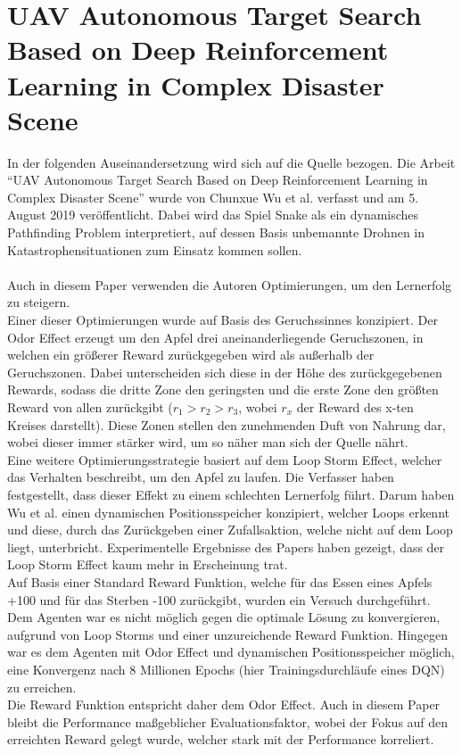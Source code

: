 \section{UAV Autonomous Target Search Based on Deep Reinforcement Learning in Complex Disaster Scene} \label{sec:Paper_2}
In der folgenden Auseinandersetzung wird sich auf die Quelle \cite{UAV} bezogen.
Die Arbeit "`UAV Autonomous Target Search Based on Deep Reinforcement Learning in Complex Disaster Scene"' wurde von Chunxue Wu et al. verfasst und am 5. August 2019 veröffentlicht. Dabei wird das Spiel Snake als ein dynamisches Pathfinding Problem interpretiert, auf dessen Basis unbemannte Drohnen in Katastrophensituationen zum Einsatz kommen sollen.\\
\\Auch in diesem Paper verwenden die Autoren Optimierungen, um den Lernerfolg zu steigern.\\
Einer dieser Optimierungen wurde auf Basis des Geruchssinnes konzipiert. Der Odor Effect erzeugt um den Apfel drei aneinanderliegende Geruchszonen, in welchen ein größerer Reward zurückgegeben wird als außerhalb der Geruchszonen. Dabei unterscheiden sich diese in der Höhe des zurückgegebenen Rewards, sodass die dritte Zone den geringsten und die erste Zone den größten Reward von allen zurückgibt ($r_1 > r_2 > r_3$, wobei $r_x$ der Reward des x-ten Kreises darstellt).
Diese Zonen stellen den zunehmenden Duft von Nahrung dar, wobei dieser immer stärker wird, um so näher man sich der Quelle nährt.\\
Eine weitere Optimierungsstrategie basiert auf dem Loop Storm Effect, welcher das Verhalten beschreibt, um den Apfel zu laufen. Die Verfasser haben festgestellt, dass dieser Effekt zu einem schlechten Lernerfolg führt. Darum haben Wu et al. einen dynamischen Positionsspeicher konzipiert, welcher Loops erkennt und diese, durch das Zurückgeben einer Zufallsaktion, welche nicht auf dem Loop liegt, unterbricht. Experimentelle Ergebnisse des Papers haben gezeigt, dass der Loop Storm Effect kaum mehr in Erscheinung trat.\\
Auf Basis einer Standard Reward Funktion, welche für das Essen eines Apfels +100 und für das Sterben -100 zurückgibt, wurden ein Versuch durchgeführt. Dem Agenten war es nicht möglich gegen die optimale Lösung zu konvergieren, aufgrund von Loop Storms und einer unzureichende Reward Funktion. Hingegen war es dem Agenten mit Odor Effect und dynamischen Positionsspeicher möglich, eine Konvergenz nach 8 Millionen Epochs (hier Trainingsdurchläufe eines DQN) zu erreichen.\\
Die Reward Funktion entspricht daher dem Odor Effect.
Auch in diesem Paper bleibt die Performance maßgeblicher Evaluationsfaktor, wobei der Fokus auf den erreichten Reward gelegt wurde, welcher stark mit der Performance korreliert.


